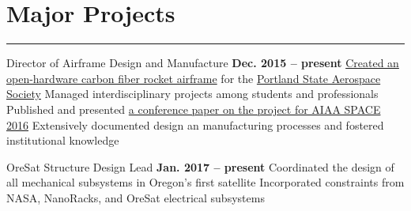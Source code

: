 \section{Major Projects}
\noindent\rule{\textwidth}{\hlinewidth}
	\begin{innerlist}
	\item Director of Airframe Design and Manufacture
		\hfill\textbf{Dec. 2015 -- present} %
		\subitem \href{https://github.com/psas/sw-cad-airframe-lv3.0}{Created 
			an open-hardware carbon fiber rocket airframe} for the 
			\href{http://psas.pdx.edu/}{Portland State Aerospace Society}
		\subitem Managed interdisciplinary projects among students and professionals
		\subitem Published and presented \href{http://arc.aiaa.org/doi/pdf/10.2514/6.2016-5365}{a conference paper on the project for AIAA SPACE 2016}
		\subitem Extensively documented design an manufacturing processes and fostered institutional knowledge
	\\
	\item OreSat Structure Design Lead
		\hfill\textbf{Jan. 2017 -- present}
		\subitem Coordinated the design of all mechanical subsystems in Oregon's first satellite
		\subitem Incorporated constraints from NASA, NanoRacks, and OreSat electrical subsystems
	\end{innerlist}
\vfill
